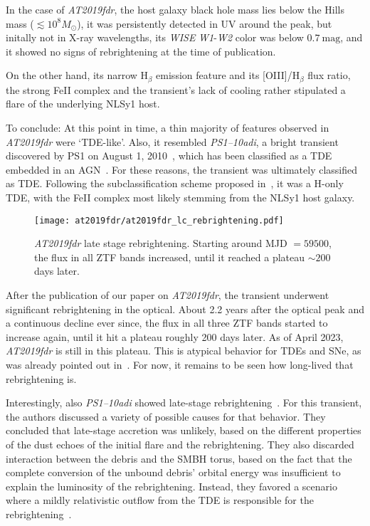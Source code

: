 In the case of \emph{AT2019fdr}, the host galaxy black hole mass lies below the Hills mass ($\lesssim 10^8 M_\odot$), it was persistently detected in UV around the peak, but initally not in X-ray wavelengths, its \textit{WISE} \textit{W1}-\textit{W2} color was below $0.7~\text{mag}$, and it showed no signs of rebrightening at the time of publication.

On the other hand, its narrow H$_\beta$ emission feature and its [OIII]/H$_\beta$ flux ratio, the strong FeII complex and the transient's lack of cooling rather stipulated a flare of the underlying NLSy1 host.

To conclude: At this point in time, a thin majority of features observed in \emph{AT2019fdr} were `TDE-like'. Also, it resembled \emph{PS1--10adi}, a bright transient discovered by PS1 on August 1, 2010~, which has been classified as a TDE embedded in an AGN~. For these reasons, the transient was ultimately classified as TDE. Following the subclassification scheme proposed in~, it was a H-only TDE, with the FeII complex most likely stemming from the NLSy1 host galaxy.

\begin{figure}[htb]
    \texttt{[image: at2019fdr/at2019fdr\_lc\_rebrightening.pdf]}
    \caption[\emph{AT2019fdr} rebrightening]{\emph{AT2019fdr} late stage rebrightening. Starting around MJD $=59500$, the flux in all ZTF bands increased, until it reached a plateau $\sim 200$ days later.}
\end{figure}

After the publication of our paper on \emph{AT2019fdr}, the transient underwent significant rebrightening in the optical. About 2.2 years after the optical peak and a continuous decline ever since, the flux in all three ZTF bands started to increase again, until it hit a plateau roughly 200 days later. As of April 2023, \emph{AT2019fdr} is still in this plateau. This is atypical behavior for TDEs and SNe, as was already pointed out in~\cite{Frederick2021}. For now, it remains to be seen how long-lived that rebrightening is.

Interestingly, also \emph{PS1--10adi} showed late-stage rebrightening~\cite{Jiang2019}. For this transient, the authors discussed a variety of possible causes for that behavior. They concluded that late-stage accretion was unlikely, based on the different properties of the dust echoes of the initial flare and the rebrightening. They also discarded interaction between the debris and the SMBH torus, based on the fact that the complete conversion of the unbound debris' orbital energy was insufficient to explain the luminosity of the rebrightening. Instead, they favored a scenario where a mildly relativistic outflow from the TDE is responsible for the rebrightening~\cite{Jiang2019}.

